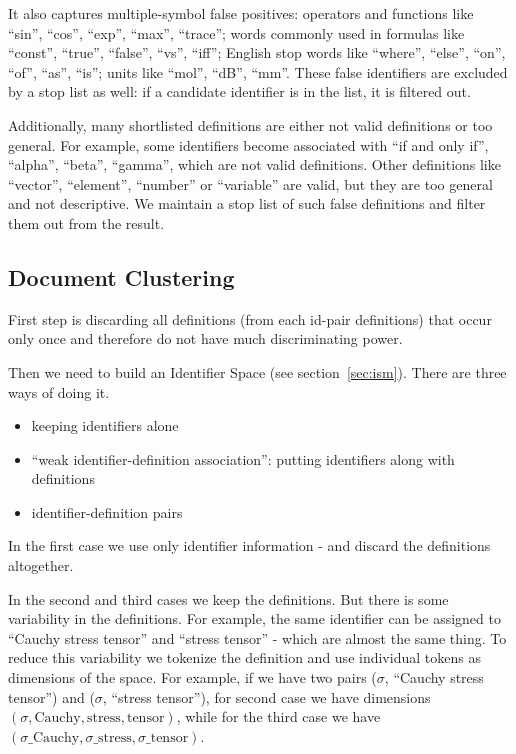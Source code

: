 It also captures multiple-symbol false positives: operators and functions
like ``sin'', ``cos'', ``exp'', ``max'', ``trace''; 
words commonly used in formulas like ``const'', ``true'', ``false'',
``vs'', ``iff''; English stop words like ``where'', ``else'', ``on'', 
``of'', ``as'', ``is''; units like ``mol'', ``dB'', ``mm''.
These false identifiers are excluded by a stop list as well: if a
candidate identifier is in the list, it is filtered out.


Additionally, many shortlisted definitions are either not valid definitions or too general. 
For example, some identifiers become associated with ``if and only if'', 
``alpha'', ``beta'', ``gamma'', which are not valid definitions. Other definitions
like ``vector'', ``element'', ``number'' or ``variable'' are valid, but 
they are too general and not descriptive.
We maintain a stop list of such false definitions and filter them out from 
the result. 




\subsection{Document Clustering}

First step is discarding all definitions (from each id-pair definitions)
that occur only once and therefore do not have much discriminating power. 

Then we need to build an Identifier Space (see section~\ref{sec:ism}). 
There are three ways of doing it.

\begin{itemize}
  \item keeping identifiers alone
  \item ``weak identifier-definition association'': putting identifiers along with definitions
  \item identifier-definition pairs 
\end{itemize}

In the first case we use only identifier information - and discard the 
definitions altogether.

In the second and third cases we keep the definitions. 
But there is some variability in the definitions. For example, 
the same identifier can be assigned to ``Cauchy stress tensor'' and
``stress tensor'' - which are almost the same thing. To reduce 
this variability we tokenize the definition and use individual tokens
as dimensions of the space. For example, if we have two pairs
($\sigma$, ``Cauchy stress tensor'') and ($\sigma$, ``stress tensor''),
for second case we have dimensions $(\sigma, \text{Cauchy}, \text{stress}, \text{tensor})$,
while for the third case we have 
$(\sigma\text{\_Cauchy}, \sigma\text{\_stress}, \sigma\text{\_tensor})$.


